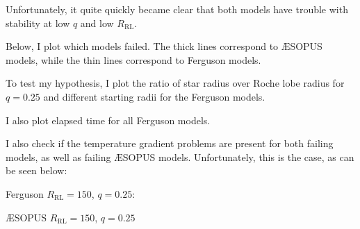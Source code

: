 \documentclass[a4paper,10pt]{article}
\begin{document}
Unfortunately, it quite quickly became clear that both models have trouble with stability at low \(q\) and low \(R_\text{RL}\).

Below, I plot which models failed. The thick lines correspond to \AE SOPUS models, while the thin lines correspond to Ferguson models.

\begin{figure}[ht]
    \centering
\end{figure}

To test my hypothesis, I plot the ratio of star radius over Roche lobe radius for \(q=0.25\) and different starting radii for the Ferguson models.

\begin{figure}[ht]
    \centering
\end{figure}

I also plot elapsed time for all Ferguson models.

\begin{figure}[ht]
    \centering
\end{figure}

\nextpage

I also check if the temperature gradient problems are present for both failing \citet{ferguson1905} models, as well as failing \AE SOPUS \citep{marigo2009} models. Unfortunately, this is the case, as can be seen below:

Ferguson \(R_\text{RL} = 150\), \(q = 0.25\):
\begin{figure}[ht]
    \centering
\end{figure}

\AE SOPUS \(R_\text{RL} = 150\), \(q = 0.25\)
\begin{figure}[ht]
    \centering
\end{figure}
\end{document}
